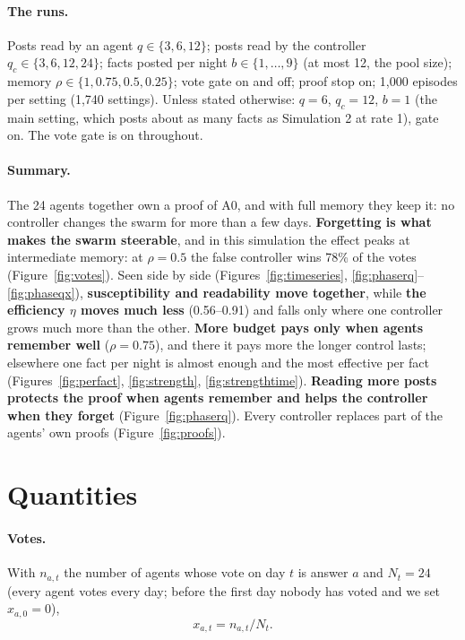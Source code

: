 \documentclass[10pt,a4paper]{article}
\begin{document}
\paragraph{The runs.} Posts read by an agent $q \in \{3, 6, 12\}$; posts read by the controller
$q_c \in \{3, 6, 12, 24\}$; facts posted per night $b \in \{1, \dots, 9\}$ (at most 12, the pool size); memory
$\rho \in \{1, 0.75, 0.5, 0.25\}$; vote gate on and off; proof stop on; 1{,}000 episodes per setting (1{,}740
settings). Unless stated otherwise: $q = 6$, $q_c = 12$, $b = 1$ (the main setting, which posts about as many
facts as Simulation 2 at rate 1), gate on. The vote gate is on throughout.

\paragraph{Summary.} The 24 agents together own a proof of A0, and with full memory they keep it: no controller
changes the swarm for more than a few days. \textbf{Forgetting is what makes the swarm steerable}, and in this
simulation the effect peaks at intermediate memory: at $\rho = 0.5$ the false controller wins 78\% of the votes
(Figure~\ref{fig:votes}). Seen side by side (Figures~\ref{fig:timeseries}, \ref{fig:phaserq}--\ref{fig:phaseqx}),
\textbf{susceptibility and readability move together}, while \textbf{the efficiency $\eta$ moves much less}
(0.56--0.91) and falls only where one controller grows much more than the other. \textbf{More budget pays only when
agents remember well} ($\rho = 0.75$), and there it pays more the longer control lasts; elsewhere one fact per night
is almost enough and the most effective per fact (Figures~\ref{fig:perfact}, \ref{fig:strength},
\ref{fig:strengthtime}). \textbf{Reading more posts protects the proof when agents remember and helps the controller
when they forget} (Figure~\ref{fig:phaserq}). Every controller replaces part of the agents' own proofs
(Figure~\ref{fig:proofs}).

\section{Quantities}\label{sec:quantities}

\paragraph{Votes.} With $n_{a,t}$ the number of agents whose vote on day $t$ is answer $a$ and $N_t = 24$ (every
agent votes every day; before the first day nobody has voted and we set $x_{a,0} = 0$),
\begin{equation}\label{eq:share}
x_{a,t} = n_{a,t}/N_t .
\end{equation}
\end{document}

